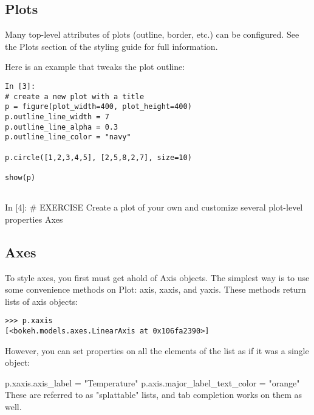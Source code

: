 \subsection{Plots}
Many top-level attributes of plots (outline, border, etc.) can be configured. See the Plots section of the styling guide for full information.

Here is an example that tweaks the plot outline:

\begin{verbatim}
In [3]:
# create a new plot with a title
p = figure(plot_width=400, plot_height=400)
p.outline_line_width = 7
p.outline_line_alpha = 0.3
p.outline_line_color = "navy"

p.circle([1,2,3,4,5], [2,5,8,2,7], size=10)

show(p)
	
\end{verbatim}

In [4]:
# EXERCISE Create a plot of your own and customize several plot-level properties
Axes


\subsection{Axes}

To style axes, you first must get ahold of Axis objects. The simplest way is to use some convenience methods on Plot: axis, xaxis, and yaxis. These methods return lists of axis objects:
\\
\begin{framed}
	\begin{verbatim}
>>> p.xaxis
[<bokeh.models.axes.LinearAxis at 0x106fa2390>]
\end{verbatim}
\end{framed}
However, you can set properties on all the elements of the list as if it was a single object:

p.xaxis.axis_label = "Temperature"
p.axis.major_label_text_color = "orange"
These are referred to as "splattable" lists, and tab completion works on them as well.

